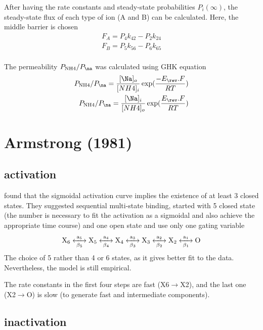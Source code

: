 After having the rate constants and steady-state probabilities $P_i(\infty)$,
the steady-state flux of each type of ion (A and B) can be calculated. Here, the
middle barrier is chosen
\begin{equation}
\begin{split}
F_A = P_4 k_{42} - P_2 k_{24} \\
F_B = P_5 k_{56} - P_6 k_{65} \\
\end{split}
\end{equation}

The permeability $P_\text{NH4}/P_\na$ was calculated using GHK equation
\begin{equation}
\begin{split}
P_\text{NH4}/P_\na	 = \frac{[\Na]_o}{[NH4]_i} \exp(\frac{-E_\rev.F}{RT}) \\
P_\text{NH4}/P_\na	 = \frac{[\Na]_i}{[NH4]_o} \exp(\frac{E_\rev.F}{RT}) \\
\end{split}
\end{equation}


\section{Armstrong (1981)}
\label{sec:Ina_Armstrong1981}

\subsection{activation}

\citep{armstrong1981}  found that the sigmoidal activation curve implies the
existence of at least 3 closed states. They suggested sequential multi-state
binding, started with 5 closed state (the number is necessary to fit the
activation as a sigmoidal and also achieve the appropriate time course) and one
open state and use only one gating variable
\begin{equation}
\ce{X6 <->[a_5][\beta_5] X5 <->[a_4][\beta_4] X4 <->[a_3][\beta_3] X3
<->[a_2][\beta_2] X2 <->[a_1][\beta_1] \text{O}}
\end{equation}
The choice of 5 rather than 4 or 6 states, as it gives better fit to the data.
Nevertheless, the model is still empirical. 

The rate constants in the first four steps are
fast (X6$\rightarrow$X2), and the last one (X2$\rightarrow$O) is slow (to
generate fast and intermediate components).

\subsection{inactivation}

